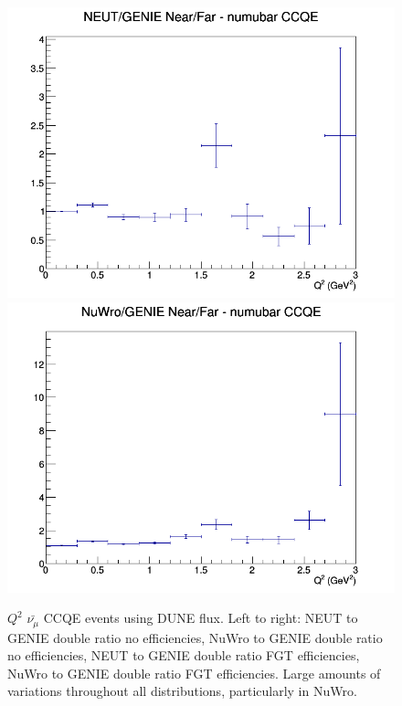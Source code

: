 \documentclass[12pt]{article}
\begin{document}
\begin{figure}[h]
\endminipage
{}
\includegraphics[width=\linewidth]{eff_Q2/FGT/ratios/CCQE_NEUT_GENIE_numubar_NF_Q2.png}
\endminipage
{}
\includegraphics[width=\linewidth]{eff_Q2/FGT/ratios/CCQE_NuWro_GENIE_numubar_NF_Q2.png}
\endminipage
\caption{$Q^2$ $\bar{\nu_{\mu}}$ CCQE events using DUNE flux. Left to right: NEUT to GENIE double ratio no efficiencies, NuWro to GENIE double ratio no efficiencies, NEUT to GENIE double ratio FGT efficiencies, NuWro to GENIE double ratio FGT efficiencies. Large amounts of variations throughout all distributions, particularly in NuWro. }
\label{fig:Q2_ccqe_bar}
\end{figure}
\FloatBarrier
\end{document}

